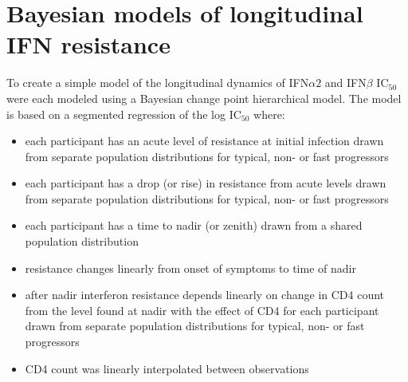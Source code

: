 \documentclass[12pt]{article}
\newcommand{\ifna}{IFN${\alpha 2}$}
\newcommand{\ifnb}{IFN${\beta}$}
\newcommand{\icFifty}{IC$_{50}$}
\begin{document}
\begin{center}
 \Large\textbf{}
\end{center}
\section*{Bayesian models of longitudinal IFN resistance}
To create a simple model of the longitudinal dynamics of \ifna{} and \ifnb{} \icFifty{} were each modeled using a Bayesian change point hierarchical model.
  The model is based on a segmented regression of the log \icFifty{} where:
    \begin{itemize}
          \item each participant has an acute level of resistance at initial infection drawn from separate population distributions for typical, non- or fast progressors
          \item each participant has a drop (or rise) in resistance from acute levels drawn from separate population distributions for typical, non- or fast progressors
          \item each participant has a time to nadir (or zenith) drawn from a shared population distribution
          \item resistance changes linearly from onset of symptoms to time of nadir
          \item after nadir interferon resistance depends linearly on change in CD4 count from the level found at nadir with the effect of CD4 for each participant drawn from separate population distributions for typical, non- or fast progressors
          \item CD4 count was linearly interpolated between observations
    \end{itemize}
  
\end{document}
